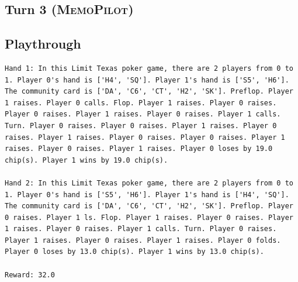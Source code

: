 \documentclass{article}
\newcommand{\methodname}{MemoPilot}
\newcommand{\method}{\textsc{\methodname}}
\theoremstyle{plain}
\theoremstyle{definition}
\theoremstyle{remark}
\begin{document}
\begin{tcolorbox}[breakable]
\subsection*{Turn 3 (\method{})}
\vspace{-5pt}

\subsection*{Playthrough }
\vspace{-5pt}
\begin{lstlisting}[basicstyle=\scriptsize\ttfamily, breaklines=true]
Hand 1: In this Limit Texas poker game, there are 2 players from 0 to 1. Player 0's hand is ['H4', 'SQ']. Player 1's hand is ['S5', 'H6']. The community card is ['DA', 'C6', 'CT', 'H2', 'SK']. Preflop. Player 1 raises. Player 0 calls. Flop. Player 1 raises. Player 0 raises. Player 0 raises. Player 1 raises. Player 0 raises. Player 1 calls. Turn. Player 0 raises. Player 0 raises. Player 1 raises. Player 0 raises. Player 1 raises. Player 0 raises. Player 0 raises. Player 1 raises. Player 0 raises. Player 1 raises. Player 0 loses by 19.0 chip(s). Player 1 wins by 19.0 chip(s).

Hand 2: In this Limit Texas poker game, there are 2 players from 0 to 1. Player 0's hand is ['S5', 'H6']. Player 1's hand is ['H4', 'SQ']. The community card is ['DA', 'C6', 'CT', 'H2', 'SK']. Preflop. Player 0 raises. Player 1 ls. Flop. Player 1 raises. Player 0 raises. Player 1 raises. Player 0 raises. Player 1 calls. Turn. Player 0 raises. Player 1 raises. Player 0 raises. Player 1 raises. Player 0 folds. Player 0 loses by 13.0 chip(s). Player 1 wins by 13.0 chip(s).

Reward: 32.0
\end{lstlisting}
\vspace{5pt}


\end{tcolorbox}
\end{document}
